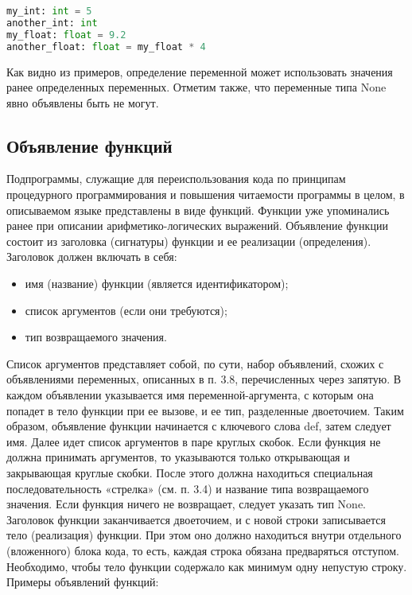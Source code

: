 \begin{lstlisting}[language=Python, caption=Пример кода на Python]
my_int: int = 5
another_int: int
my_float: float = 9.2
another_float: float = my_float * 4
\end{lstlisting}

Как видно из примеров, определение переменной может использовать значения ранее определенных переменных. Отметим также, что переменные типа None явно объявлены быть не могут.

\subsection{Объявление функций}

Подпрограммы, служащие для переиспользования кода по принципам процедурного программирования и повышения читаемости программы в целом, в описываемом языке представлены в виде функций. Функции уже упоминались ранее при описании арифметико-логических выражений. Объявление функции состоит из заголовка (сигнатуры) функции и ее реализации (определения). Заголовок должен включать в себя:

\begin{itemize}
    \item имя (название) функции (является идентификатором);
    \item список аргументов (если они требуются);
    \item тип возвращаемого значения.
\end{itemize}

Список аргументов представляет собой, по сути, набор объявлений, схожих с объявлениями переменных, описанных в п. 3.8, перечисленных через запятую. В каждом объявлении указывается имя переменной-аргумента, с которым она попадет в тело функции при ее вызове, и ее тип, разделенные двоеточием.
Таким образом, объявление функции начинается с ключевого слова def, затем следует имя. Далее идет список аргументов в паре круглых скобок. Если функция не должна принимать аргументов, то указываются только открывающая и закрывающая круглые скобки. После этого должна находиться специальная последовательность «стрелка» (см. п. 3.4) и название типа возвращаемого значения. Если функция ничего не возвращает, следует указать тип None. Заголовок функции заканчивается двоеточием, и с новой строки записывается тело (реализация) функции. При этом оно должно находиться внутри отдельного (вложенного) блока кода, то есть, каждая строка обязана предваряться отступом. Необходимо, чтобы тело функции содержало как минимум одну непустую строку.
Примеры объявлений функций:

